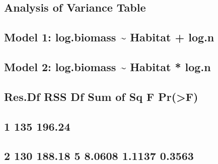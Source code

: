\documentclass[
]{article}
\begin{document}
\hypertarget{analysis-of-variance-table-1}{%
\subsection{Analysis of Variance
Table}\label{analysis-of-variance-table-1}}

\hypertarget{section-41}{%
\subsection{}\label{section-41}}

\hypertarget{model-1-log.biomass-habitat-log.n}{%
\subsection{Model 1: log.biomass \textasciitilde{} Habitat +
log.n}\label{model-1-log.biomass-habitat-log.n}}

\hypertarget{model-2-log.biomass-habitat-log.n}{%
\subsection{Model 2: log.biomass \textasciitilde{} Habitat *
log.n}\label{model-2-log.biomass-habitat-log.n}}

\hypertarget{res.df-rss-df-sum-of-sq-f-prf}{%
\subsection{Res.Df RSS Df Sum of Sq F
Pr(\textgreater F)}\label{res.df-rss-df-sum-of-sq-f-prf}}

\hypertarget{section-42}{%
\subsection{1 135 196.24}\label{section-42}}

\hypertarget{section-43}{%
\subsection{2 130 188.18 5 8.0608 1.1137 0.3563}\label{section-43}}

\begin{verbatim}
\end{verbatim}

\hypertarget{section-44}{%
\subsection{}\label{section-44}}
\end{document}
